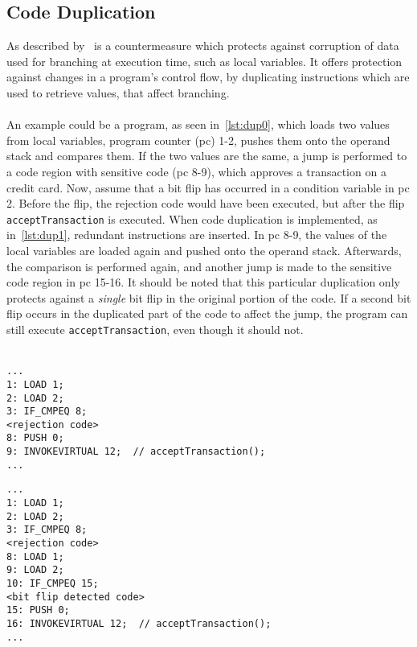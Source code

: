 \subsection{Code Duplication}
As described by~\cite{mksb} is a countermeasure which protects against corruption of data used for branching at execution time, such as local variables. It offers protection against changes in a program's control flow, by duplicating instructions which are used to retrieve values, that affect branching.\\\\
An example could be a program, as seen in~\cref{lst:dup0}, which loads two values from local variables, program counter (pc) 1-2, pushes them onto the operand stack and compares them. If the two values are the same, a jump is performed to a code region with sensitive code (pc 8-9), which approves a transaction on a credit card. Now, assume that a bit flip has occurred in a condition variable in pc 2. Before the flip, the rejection code would have been executed, but after the flip \texttt{acceptTransaction} is executed. When code duplication is implemented, as in~\cref{lst:dup1}, redundant instructions are inserted. In pc 8-9, the values of the local variables are loaded again and pushed onto the operand stack. Afterwards, the comparison is performed again, and another jump is made to the sensitive code region in pc 15-16. It should be noted that this particular duplication only protects against a \textit{single} bit flip in the original portion of the code. If a second bit flip occurs in the duplicated part of the code to affect the jump, the program can still execute \texttt{acceptTransaction}, even though it should not.\\\\


\begin{lstlisting}[caption={Original program without code duplication implemented. The code is written in \jcl.},numbers=none, label={lst:dup0}]
...
1: LOAD 1;
2: LOAD 2;
3: IF_CMPEQ 8;
<rejection code>
8: PUSH 0;
9: INVOKEVIRTUAL 12;  // acceptTransaction();
...
\end{lstlisting}

\newpage

\begin{lstlisting}[caption={Modified program with code duplication implemented. The code is written in \jcl.},numbers=none, label={lst:dup1}]
...
1: LOAD 1;
2: LOAD 2;
3: IF_CMPEQ 8;
<rejection code>
8: LOAD 1;
9: LOAD 2;
10: IF_CMPEQ 15;
<bit flip detected code>
15: PUSH 0;
16: INVOKEVIRTUAL 12;  // acceptTransaction();
...
\end{lstlisting}

